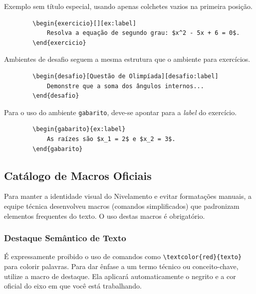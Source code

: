 \begin{exemplo}

    Exemplo sem título especial, usando apenas colchetes vazios na primeira posição.
    \begin{verbatim}
        \begin{exercicio}[][ex:label]
            Resolva a equação de segundo grau: $x^2 - 5x + 6 = 0$.
        \end{exercicio}
    \end{verbatim}

    Ambientes de desafio seguem a mesma estrutura que o ambiente para exercícios.
    \begin{verbatim}
        \begin{desafio}[Questão de Olimpíada][desafio:label]
            Demonstre que a soma dos ângulos internos...
        \end{desafio}        
    \end{verbatim}

    Para o uso do ambiente \texttt{gabarito}, deve-se apontar para a \textit{label} do exercício.
    \begin{verbatim}
        \begin{gabarito}{ex:label}
            As raízes são $x_1 = 2$ e $x_2 = 3$.
        \end{gabarito}
    \end{verbatim}
\end{exemplo}

\subsection{Catálogo de Macros Oficiais}

Para manter a identidade visual do Nivelamento e evitar formatações manuais, a equipe técnica desenvolveu macros (comandos simplificados) que padronizam elementos frequentes do texto. O uso destas macros é obrigatório.

\subsubsection{Destaque Semântico de Texto}

É expressamente proibido o uso de comandos como \verb|\textcolor{red}{texto}| para colorir palavras. Para dar ênfase a um termo técnico ou conceito-chave, utilize a macro de destaque. Ela aplicará automaticamente o negrito e a cor oficial do eixo em que você está trabalhando.

